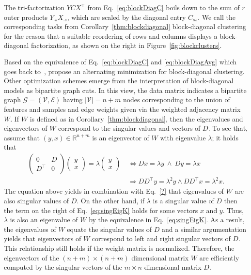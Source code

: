 The tri-factorization $YCX^\top$ from Eq.~\@\eqref{eq:blockDiagC} boils down to the sum of $r$ outer products $Y_{\cdot s}X_{\cdot s}$, which are scaled by the diagonal entry $C_{ss}$. We call the corresponding tasks from Corollary~\ref{thm:blockdiagonal} block-diagonal clustering for the reason that a suitable reordering of rows and columns displays a block-diagonal factorization, as shown on the right in Figure~\ref{fig:blockclusters}.

Based on the equivalence of Eq.~\eqref{eq:blockDiagC} and \eqref{eq:blockDiagAvg} which goes back to~\cite{mirkin1995additive}, \cite{han2017bilateral} propose an alternating minimization for block-diagonal clustering.
Other optimization schemes emerge from the interpretation of 
block-diagonal models as bipartite graph cuts. In this view, the data matrix indicates a bipartite graph $\mathcal{G}=(\mathcal{V},\mathcal{E})$ having $|\mathcal{V}|=n+m$ nodes corresponding to the union of features and samples and edge weights given via the weighted adjacency matrix $W$.
If $W$ is defined as in Corollary~\ref{thm:blockdiagonal}, then the eigenvalues and eigenvectors of $W$ correspond to the singular values and vectors of $D$. To see that, assume that $(y,x)\in\mathbb{R}^{n+m}$ is an eigenvector of $W$ with eigenvalue $\lambda$; it holds that
\begin{align}
\begin{pmatrix}
0 & D\\
D^\top & 0
\end{pmatrix}
\begin{pmatrix}
y\\x
\end{pmatrix}
= \lambda \begin{pmatrix}
y\\ x
\end{pmatrix}\ 
&\Leftrightarrow Dx=\lambda y \ \wedge \ Dy=\lambda x\label{eq:singEigK}\\
&\Rightarrow DD^\top y = \lambda^2 y \wedge DD^\top x=\lambda^2 x. \nonumber
\end{align}
The equation above yields in combination with Eq.~\eqref{?} that eigenvalues of $W$ are also singular values of $D$. On the other hand, if $\lambda$ is a singular value of $D$ then the term on the right of Eq.~\eqref{eq:singEigK} holds for some vectors $x$ and $y$. Thus, $\lambda$ is also an eigenvalue of $W$ by the equivalence in Eq.~\eqref{eq:singEigK}. As a result, the eigenvalues of $W$ equate the singular values of $D$ and a similar argumentation yields that eigenvectors of $W$ correspond to left and right singular vectors of $D$. This relationship still holds if the weight matrix is normalized. Therefore, the eigenvectors of the $(n+m)\times (n+m)$ dimensional matrix $W$ are efficiently computed by the singular vectors of the $m\times n$ dimensional matrix $D$. 

